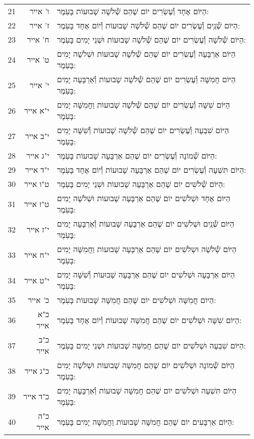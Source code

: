 \documentclass[twoside, openany, parskip=half, 11pt]{book}
\begin{document}
\begin{scriptsize}
\begin{longtable}{ l | r | p{} }
21 & ו' אייר & הַיּוֹם אֶחָד וְ֯עֶשְׂרִים יוֹם שֶׁהֵם שְׁ֯לֹשָׁה שָׁבוּעוֹת בָּעֹֽמֶר: \\
22 & ז' אייר & הַיּוֹם שְׁ֯נַֽיִם וְ֯עֶשְׂרִים יוֹם שֶׁהֵם שְׁ֯לֹשָׁה שָׁבוּעוֹת וְ֯יוֹם אֶחָד בָּעֹֽמֶר: \\
23 & ח' אייר & הַיּוֹם שְׁ֯לֹשָׁה וְ֯עֶשְׂרִים יוֹם שֶׁהֵם שְׁ֯לֹשָׁה שָׁבוּעוֹת וּשְׁנֵי יָמִים בָּעֹֽמֶר: \\
24 & ט' אייר & הַיּוֹם אַרְבָּעָה וְ֯עֶשְׂרִים יוֹם שֶׁהֵם שְׁ֯לֹשָׁה שָׁבוּעוֹת וּשְׁלֹשָׁה יָמִים בָּעֹֽמֶר: \\
25 & י' אייר & הַיּוֹם חֲמִשָּׁה וְ֯עֶשְׂרִים יוֹם שֶׁהֵם שְׁ֯לֹשָׁה שָׁבוּעוֹת וְ֯אַרְבָּעָה יָמִים בָּעֹֽמֶר: \\
26 & י"א אייר & הַיּוֹם שִׁשָּׁה וְ֯עֶשְׂרִים יוֹם שֶׁהֵם שְׁ֯לֹשָׁה שָׁבוּעוֹת וַחֲמִשָּׁה יָמִים בָּעֹֽמֶר: \\
27 & י"ב אייר & הַיּוֹם שִׁבְעָה וְ֯עֶשְׂרִים יוֹם שֶׁהֵם שְׁ֯לֹשָׁה שָׁבוּעוֹת וְ֯שִׁשָּׁה יָמִים בָּעֹֽמֶר: \\
28 & י"ג אייר & הַיּוֹם שְׁ֯מוֹנָה וְ֯עֶשְׂרִים יוֹם שֶׁהֵם אַרְבָּעָה שָׁבוּעוֹת בָּעֹֽמֶר: \\
29 & י"ד אייר & הַיּוֹם תִּשְׁעָה וְ֯עֶשְׂרִים יוֹם שֶׁהֵם אַרְבָּעָה שָׁבוּעוֹת וְ֯יוֹם אֶחָד בָּעֹֽמֶר: \\
30 & ט"ו אייר & הַיּוֹם שְׁ֯לֹשִׁים יוֹם שֶׁהֵם אַרְבָּעָה שָׁבוּעוֹת וּשְׁנֵי יָמִים בָּעֹֽמֶר: \\
31 & ט"ז אייר & הַיּוֹם אֶחָד וּשְׁלֹשִׁים יוֹם שֶׁהֵם אַרְבָּעָה שָׁבוּעוֹת וּשְׁלֹשָׁה יָמִים בָּעֹֽמֶר: \\
32 & י"ז אייר & הַיּוֹם שְׁ֯נַֽיִם וּשְׁלֹשִׁים יוֹם שֶׁהֵם אַרְבָּעָה שָׁבוּעוֹת וְ֯אַרְבָּעָה יָמִים בָּעֹֽמֶר: \\
33 & י"ח אייר & הַיּוֹם שְׁ֯לֹשָׁה וּשְלֹשִׁים יוֹם שֶׁהֵם אַרְבָּעָה שָׁבוּעוֹת וַחֲמִשָּׁה יָמִים בָּעֹֽמֶר: \\
34 & י"ט אייר & הַיּוֹם אַרְבָּעָה וּשְׁלֹשִׁים יוֹם שֶׁהֵם אַרְבָּעָה שָׁבוּעוֹת וְ֯שִׁשָּׁה יָמִים בָּעֹֽמֶר: \\
35 & כ' אייר & הַיּוֹם חֲמִשָּׁה וּשְׁלֹשִׁים יוֹם שֶׁהֵם חֲמִשָּׁה שָׁבוּעוֹת בָּעֹֽמֶר: \\
36 & כ"א אייר & הַיּוֹם שִׁשָּׁה וּשְׁלֹשִׁים יוֹם שֶׁהֵם חֲמִשָּׁה שָׁבוּעוֹת וְ֯יוֹם אֶחָד בָּעֹֽמֶר: \\
37 & כ"ב אייר & הַיּוֹם שִׁבְעָה וּשְׁלֹשִׁים יוֹם שֶׁהֵם חֲמִשָּׁה שָׁבוּעוֹת וּשְׁנֵי יָמִים בָּעֹֽמֶר: \\
38 & כ"ג אייר & הַיּוֹם שְׁ֯מוֹנָה וּשְׁלֹשִׁים יוֹם שֶׁהֵם חֲמִשָּׁה שָׁבוּעוֹת וּשְׁלֹשָׁה יָמִים בָּעֹֽמֶר: \\
39 & כ"ד אייר & הַיּוֹם תִּשְׁעָה וּשְׁלֹשִׁים יוֹם שֶׁהֵם חֲמִשָּׁה שָׁבוּעוֹת וְ֯אַרְבָּעָה יָמִים בָּעֹֽמֶר: \\
40 & כ"ה אייר & הַיּוֹם אַרְבָּעִים יוֹם שֶׁהֵם חֲמִשָּׁה שָׁבוּעוֹת וַחֲמִשָּׁה יָמִים בָּעֹֽמֶר: \\

\end{longtable}
\end{scriptsize}
\end{document}
